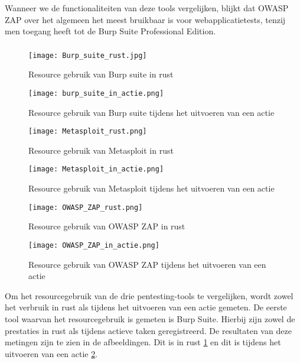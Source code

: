 Wanneer we de functionaliteiten van deze tools vergelijken, blijkt dat OWASP ZAP over het algemeen het meest bruikbaar is voor 
webapplicatietests, tenzij men toegang heeft tot de Burp Suite Professional Edition.
\subsubsection{}
\begin{figure}
    \centering
    \texttt{[image: Burp\_suite\_rust.jpg]}
    \caption[Resource gebruik van Burp suite in rust]{Resource gebruik van Burp suite in rust}
    \label{fig:burp_suite_rust}
\end{figure}
\begin{figure}
    \centering
    \texttt{[image: burp\_suite\_in\_actie.png]}
    \caption[Resource gebruik van Burp suite tijdens het uitvoeren van een actie]{Resource gebruik van Burp suite tijdens het uitvoeren van een actie}
    \label{fig:burp_suite_actie}
\end{figure}
\begin{figure}
    \centering
    \texttt{[image: Metasploit\_rust.png]}
    \caption[Resource gebruik van Metasploit in rust]{Resource gebruik van Metasploit in rust}
    \label{fig:metasploit_rust}
\end{figure}
\begin{figure}
    \centering
    \texttt{[image: Metasploit\_in\_actie.png]}
    \caption[Resource gebruik van Metasploit tijdens het uitvoeren van een actie]{Resource gebruik van Metasploit tijdens het uitvoeren van een actie}
    \label{fig:metasploit_actie}
\end{figure}
\begin{figure}
    \centering
    \texttt{[image: OWASP\_ZAP\_rust.png]}
    \caption[Resource gebruik van OWASP ZAP in rust]{Resource gebruik van OWASP ZAP in rust}
    \label{fig:owasp_rust}
\end{figure}
\begin{figure}
    \centering
    \texttt{[image: OWASP\_ZAP\_in\_actie.png]}
    \caption[Resource gebruik van OWASP ZAP tijdens het uitvoeren van een actie]{Resource gebruik van OWASP ZAP tijdens het uitvoeren van een actie}
    \label{fig:owasp_actie}
\end{figure}
Om het resourcegebruik van de drie pentesting-tools te vergelijken, wordt zowel het verbruik in rust als tijdens het 
uitvoeren van een actie gemeten. De eerste tool waarvan het resourcegebruik is gemeten is Burp Suite. Hierbij zijn zowel de 
prestaties in rust als tijdens actieve taken geregistreerd. De resultaten van deze metingen zijn te zien in de afbeeldingen. 
Dit is in rust \ref{fig:burp_suite_rust} en dit is tijdens het uitvoeren van een actie \ref{fig:burp_suite_actie}. 

